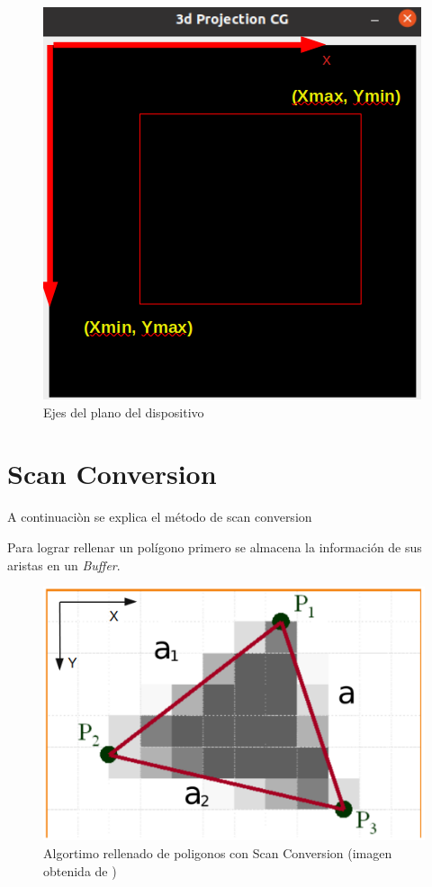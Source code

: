 \documentclass[12pt]{article}
\begin{document}
\begin{figure}[H]
\centering
\includegraphics[scale=0.45]{images/axis.png}
\caption{Ejes del plano del dispositivo}
\label{axis}
\end{figure}


\section{Scan Conversion}

A continuaciòn se explica el método de scan conversion 


Para lograr rellenar un polígono primero se almacena la información de sus aristas en un \textit{Buffer}.


\begin{figure}[H]
\centering
\includegraphics[scale=0.5]{images/scanfillED.png}
\caption{Algortimo rellenado de poligonos con Scan Conversion (imagen obtenida de \cite{fill})}
\end{figure}
\end{document}
